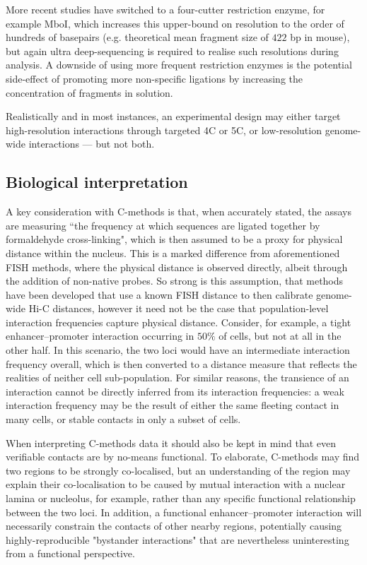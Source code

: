 \documentclass[a4paper,11pt,oneside]{book}
\begin{document}
More recent studies have switched to a four-cutter restriction enzyme, for example MboI,\cite{Rao2014} which increases this upper-bound on resolution to the order of hundreds of basepairs (e.g. theoretical mean fragment size of $422$ bp in mouse\cite{Sahlen2015}), but again ultra deep-sequencing is required to realise such resolutions during analysis. A downside of using more frequent restriction enzymes is the potential side-effect of promoting more non-specific ligations by increasing the concentration of fragments in solution.\cite{Rao2014} 

Realistically and in most instances, an experimental design may either target high-resolution interactions through targeted 4C or 5C, or low-resolution genome-wide interactions --- but not both.

\subsection{Biological interpretation}
A key consideration with C-methods is that, when accurately stated, the assays are measuring ``the frequency at which sequences are ligated together by formaldehyde cross-linking",\cite{Williamson2014} which is then assumed to be a proxy for physical distance within the nucleus. This is a marked difference from aforementioned FISH methods, where the physical distance is observed directly, albeit through the addition of non-native probes. So strong is this assumption, that methods have been developed that use a known FISH distance to then calibrate genome-wide Hi-C distances,\cite{Shavit2014} however it need not be the case that population-level interaction frequencies capture physical distance.\cite{Lajoie2014} Consider, for example, a tight enhancer--promoter interaction occurring in $50\%$ of cells, but not at all in the other half. In this scenario, the two loci would have an intermediate interaction frequency overall, which is then converted to a distance measure that reflects the realities of neither cell sub-population. For similar reasons, the transience of an interaction cannot be directly inferred from its interaction frequencies: a weak interaction frequency may be the result of either the same fleeting contact in many cells, or stable contacts in only a subset of cells.\cite{Lajoie2014}


When interpreting C-methods data it should also be kept in mind that even verifiable contacts are by no-means functional. To elaborate, C-methods may find two regions to be strongly co-localised, but an understanding of the region may explain their co-localisation to be caused by mutual interaction with a nuclear lamina or nucleolus, for example, rather than any specific functional relationship between the two loci.\cite{Dekker2013} In addition, a functional enhancer--promoter interaction will necessarily constrain the contacts of other nearby regions, potentially causing highly-reproducible "bystander interactions"\cite{Dekker2013} that are nevertheless uninteresting from a functional perspective. 
\end{document}
